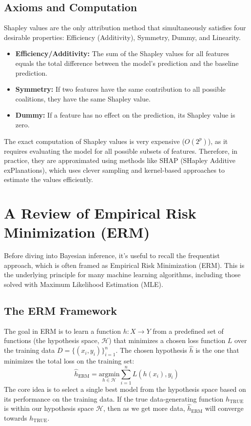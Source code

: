 \documentclass{article}
\begin{document}
\begin{multicols}{2}
	\subsection{Axioms and Computation}
	Shapley values are the only attribution method that simultaneously satisfies four desirable properties: Efficiency (Additivity), Symmetry, Dummy, and Linearity.
	\begin{itemize}
		\item \textbf{Efficiency/Additivity:} The sum of the Shapley values for all features equals the total difference between the model's prediction and the baseline prediction.
		\item \textbf{Symmetry:} If two features have the same contribution to all possible coalitions, they have the same Shapley value.
		\item \textbf{Dummy:} If a feature has no effect on the prediction, its Shapley value is zero.
	\end{itemize}
	The exact computation of Shapley values is very expensive ($O(2^p)$), as it requires evaluating the model for all possible subsets of features. Therefore, in practice, they are approximated using methods like SHAP (SHapley Additive exPlanations), which uses clever sampling and kernel-based approaches to estimate the values efficiently.


	\section{A Review of Empirical Risk Minimization (ERM)}
	Before diving into Bayesian inference, it's useful to recall the frequentist approach, which is often framed as Empirical Risk Minimization (ERM). This is the underlying principle for many machine learning algorithms, including those solved with Maximum Likelihood Estimation (MLE).

	\subsection{The ERM Framework}
	The goal in ERM is to learn a function $h: X \rightarrow Y$ from a predefined set of functions (the hypothesis space, $\mathcal{H}$) that minimizes a chosen loss function $L$ over the training data $D = \{(x_i, y_i)\}_{i=1}^n$.
	The chosen hypothesis $\hat{h}$ is the one that minimizes the total loss on the training set:
	$$ \hat{h}_{\text{ERM}} = \underset{h \in \mathcal{H}}{\text{argmin}} \sum_{i=1}^{n} L(h(x_i), y_i) $$
	The core idea is to select a single best model from the hypothesis space based on its performance on the training data. If the true data-generating function $h_{\text{TRUE}}$ is within our hypothesis space $\mathcal{H}$, then as we get more data, $\hat{h}_{\text{ERM}}$ will converge towards $h_{\text{TRUE}}$.


\end{multicols}
\end{document}
